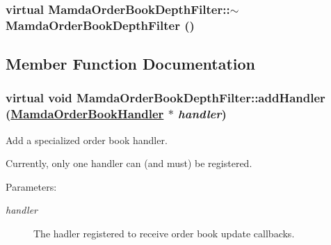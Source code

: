 \hypertarget{classMamdaOrderBookDepthFilter_016e593f9247c58f54ff1fca80373e9b}{
\subsubsection[$\sim$MamdaOrderBookDepthFilter]{\setlength{\rightskip}{0pt plus 5cm}virtual Mamda\-Order\-Book\-Depth\-Filter::$\sim$Mamda\-Order\-Book\-Depth\-Filter ()}}
\label{classMamdaOrderBookDepthFilter_016e593f9247c58f54ff1fca80373e9b}




\subsection{Member Function Documentation}
\hypertarget{classMamdaOrderBookDepthFilter_60862fa9b9c5835445940630b5f982d6}{
\subsubsection[addHandler]{\setlength{\rightskip}{0pt plus 5cm}virtual void Mamda\-Order\-Book\-Depth\-Filter::add\-Handler (\hyperlink{classWombat_1_1MamdaOrderBookHandler}{Mamda\-Order\-Book\-Handler} $\ast$ {\em handler})}}
\label{classMamdaOrderBookDepthFilter_60862fa9b9c5835445940630b5f982d6}


Add a specialized order book handler. 

Currently, only one handler can (and must) be registered.

\begin{Desc}
\item[Parameters:]
\begin{description}
\item[{\em handler}]The hadler registered to receive order book update callbacks. \end{description}
\end{Desc}


